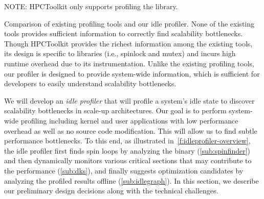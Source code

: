 \begin{table}[tb]
\centering
\scriptsize

  \vspace{0.5em}
  NOTE: HPCToolkit only supports profiling the  library.
\caption{
  Comparison of existing profiling tools and our idle profiler.
  None of the existing tools provides sufficient information to correctly
  find scalability bottlenecks. Though HPCToolkit provides the richest
  information among the existing tools, its design is specific to
   libraries (i.e., spinlock and mutex) and incurs high
  runtime overhead due to its instrumentation. Unlike the existing
  profiling tools, our profiler is designed to provide
  system-wide information, which is sufficient for
  developers to easily understand scalability bottlenecks.
}
\label{t:prof-tools}
\vspace{-5px}
\end{table}

We will develop an {\em idle profiler} that will profile a system's idle
state to discover scalability bottlenecks in scale-up
architectures. Our goal is to perform system-wide profiling including kernel
and user applications with low performance overhead as well as no
source code modification.
This will allow us to find subtle performance bottlenecks. To this end,
as illustrated in~\autoref{f:idleprofiler-overview},
the idle profiler first finds spin loops by analyzing the binary
(\autoref{sub:spinfinder}) and then dynamically monitors various critical
sections that may contribute to the performance (\autoref{sub:dks}),
and finally suggests optimization candidates by analyzing the profiled results
offline (\autoref{sub:idlegraph}).
In this section, we describe our preliminary design decisions
along with the technical challenges.




